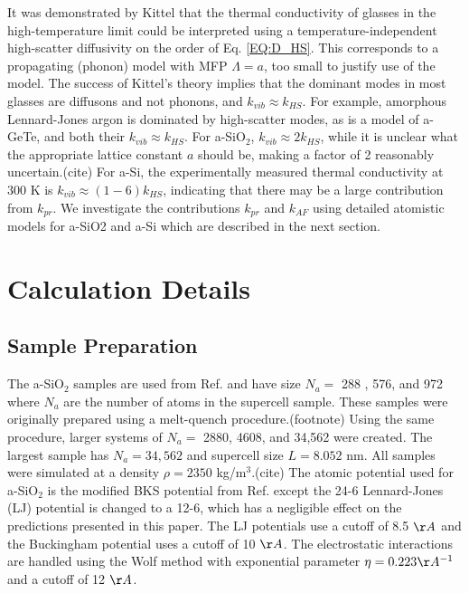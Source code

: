 \documentclass[aps,prb,twocolumn,superscriptaddress,footinbib,amsmath,amssymb,floatfix]{revtex4}
\begin{document}
It was demonstrated by Kittel that  
the thermal conductivity of glasses in the high-temperature limit could 
be interpreted 
using a temperature-independent high-scatter diffusivity on the order 
of Eq. \eqref{EQ:D_HS}.\cite{kittel_interpretation_1949}  
This corresponds to a propagating (phonon) model with MFP $\Lambda = a$, 
too small to justify use of the model. The success of Kittel's theory 
implies that the dominant 
modes in most glasses are diffusons and not phonons, and  
$k_{vib} \approx k_{HS}$.
\cite{kittel_interpretation_1949,graebner_phonon_1986}  
For example, amorphous Lennard-Jones argon is dominated 
by high-scatter modes,\cite{larkin_predicting_2013} as is a model of 
a-GeTe,\cite{sosso_thermal_2012} and both their $k_{vib} \approx k_{HS}$. 
For a-SiO$_2$, $k_{vib} \approx 2k_{HS}$, while it is unclear what the 
appropriate lattice constant $a$ should be, making a factor of 
2 reasonably uncertain.(cite) 
For a-Si, the experimentally measured thermal conductivity at 
300 K is $k_{vib} \approx (1-6) k_{HS}$,\cite{cahill_lower_1992}  
indicating that there may be a large contribution from $k_{pr}$. 
We investigate the contributions $k_{pr}$ and $k_{AF}$ using 
detailed atomistic models for a-SiO2 and a-Si which are 
described in the next section. 

\section{\label{S:Calculation}Calculation Details}

\subsection{\label{S:Sample}Sample Preparation}

The a-SiO$_2$ samples are used from Ref.  
and have size $N_a =$ 288 , 576, and 972 where $N_a$ are the number of 
atoms in the supercell sample. These samples were 
originally prepared using a melt-quench procedure.(footnote) 
Using the same procedure, larger systems of 
$N_a = $ 2880, 4608, and 34,562 were created. The largest sample 
has $N_a = 34,562$ and supercell size $L=8.052$ nm. All samples were 
simulated at a density $\rho=2350$ kg/m$^3$.(cite) 
The atomic potential used 
for a-SiO$_2$ is the modified BKS potential from Ref. 
 except the 24-6 
Lennard-Jones (LJ) potential is changed to a 12-6, 
which has a negligible effect on the predictions presented in this paper. 
The LJ potentials use a cutoff of 8.5 $\AA$ and the Buckingham 
potential uses a cutoff of 10 $\AA$. 
The electrostatic interactions are handled using the Wolf method with 
exponential parameter $\eta=0.223 \AA^{-1}$ and a cutoff of 12 $\AA$.
\cite{gale_general_2003} 
\end{document}

